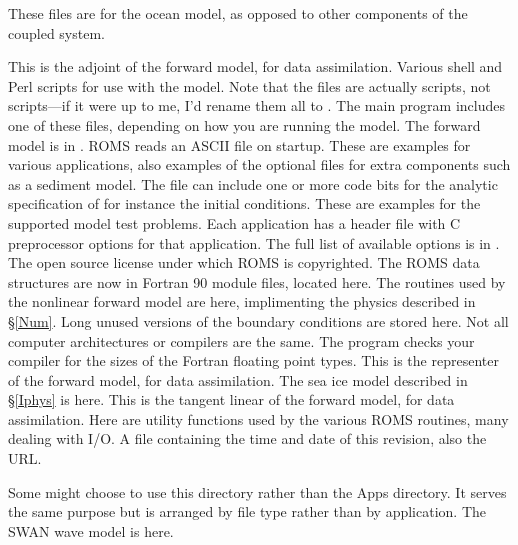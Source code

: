 \begin{klist}
  These files are for the ocean model, as opposed to other components of
  the coupled system.
\begin{klist}
   This is the adjoint of the forward model, for data
  assimilation.
   Various shell and Perl scripts for use with the model.
  Note that the  files are actually  scripts, not
   scripts---if it were up to me, I'd rename them all to .
   The main program includes one of these files,
  depending on how you are running the model. The forward model is in
  .
   ROMS reads an ASCII file on startup. These are
  examples for various applications, also examples of the optional
  files for extra components such as a sediment model.
   The file  can include one
  or more code bits for the analytic specification of for instance the
  initial conditions. These are examples for the supported model test
  problems.
   Each application has a header file with C
  preprocessor options for that application. The full list of
  available options is in .
   The open source license under which ROMS
  is copyrighted.
   The ROMS data structures are now in Fortran 90
  module files, located here.
   The routines used by the nonlinear forward model
  are here, implimenting the physics described in \S\ref{Num}.
   Long unused versions of the boundary conditions
  are stored here.
   Not all computer architectures or compilers are the same.
  The  program checks your compiler for the sizes of the
  Fortran floating point types.
   This is the representer of the forward model, for
  data assimilation.
   The sea ice model described in \S\ref{Iphys} is here.
   This is the tangent linear of the forward model, for data
  assimilation.
   Here are utility functions used by the various
  ROMS routines, many dealing with I/O.
   A file containing the time and date of this
   revision, also the  URL.
\end{klist}
   Some might choose to use this directory rather than
  the Apps directory. It serves the same purpose but is arranged
  by file type rather than by application.
   The SWAN wave model is here.
\end{klist}

